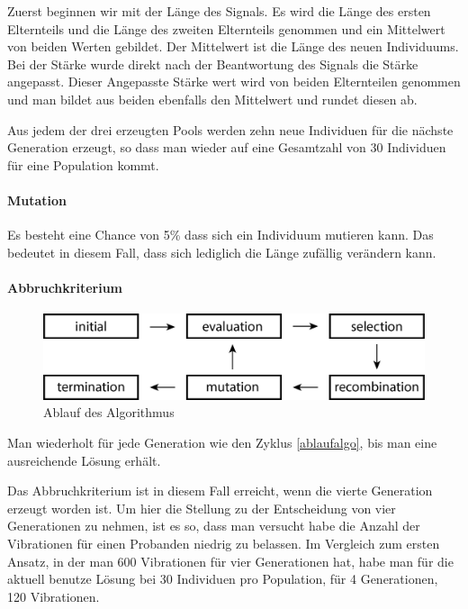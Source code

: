 Zuerst beginnen wir mit der L{\"a}nge des Signals. Es wird die L{\"a}nge des ersten Elternteils und die L{\"a}nge des zweiten Elternteils genommen und ein Mittelwert von beiden Werten gebildet. Der Mittelwert ist die L{\"a}nge des neuen Individuums.
Bei der St{\"a}rke wurde direkt nach der Beantwortung des Signals die St{\"a}rke angepasst. Dieser Angepasste St{\"a}rke wert wird von beiden Elternteilen genommen und man bildet aus beiden ebenfalls den Mittelwert und rundet diesen ab.

Aus jedem der drei erzeugten Pools werden zehn neue Individuen f{\"u}r die n{\"a}chste Generation erzeugt, so dass man wieder auf eine Gesamtzahl von 30 Individuen f{\"u}r eine Population kommt.


\paragraph{Mutation}
Es besteht eine Chance von 5\% dass sich ein Individuum mutieren kann. Das bedeutet in diesem Fall, dass sich lediglich die L{\"a}nge zuf{\"a}llig ver{\"a}ndern kann. 

\paragraph{Abbruchkriterium}
\begin{figure}
	\centering
    \includegraphics[width=\textwidth]{pics/algo.png}
    \caption{Ablauf des Algorithmus}
    \label{fig:ablaufalgo}
\end{figure}

Man wiederholt f{\"u}r jede Generation wie den Zyklus \autoref{ablaufalgo}, bis man eine ausreichende L{\"o}sung erh{\"a}lt.

Das Abbruchkriterium ist in diesem Fall erreicht, wenn die vierte Generation erzeugt worden ist. Um hier die Stellung zu der Entscheidung von vier Generationen zu nehmen, ist es so, dass man versucht habe die Anzahl der Vibrationen f{\"u}r einen Probanden niedrig zu belassen. Im Vergleich zum ersten Ansatz, in der man 600 Vibrationen f{\"u}r vier Generationen hat, habe man f{\"u}r die aktuell benutze L{\"o}sung bei 30 Individuen pro Population, f{\"u}r 4 Generationen, 120 Vibrationen. 


